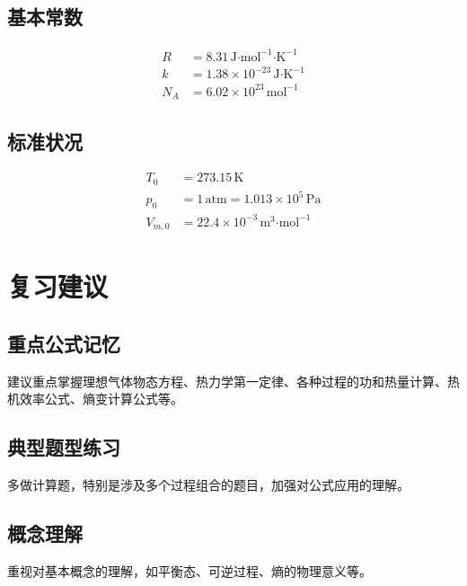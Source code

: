 \documentclass[12pt]{article}
\begin{document}
\subsection{基本常数}
\begin{align*}
    R &= 8.31 \, \text{J·mol}^{-1}\text{·K}^{-1} \\
    k &= 1.38 \times 10^{-23} \, \text{J·K}^{-1} \\
    N_A &= 6.02 \times 10^{23} \, \text{mol}^{-1}
\end{align*}

\subsection{标准状况}
\begin{align*}
    T_0 &= 273.15 \, \text{K} \\
    p_0 &= 1 \, \text{atm} = 1.013 \times 10^5 \, \text{Pa} \\
    V_{m,0} &= 22.4 \times 10^{-3} \, \text{m}^3\text{·mol}^{-1}
\end{align*}

\section*{复习建议}
\subsection{重点公式记忆}
建议重点掌握理想气体物态方程、热力学第一定律、各种过程的功和热量计算、热机效率公式、熵变计算公式等。

\subsection{典型题型练习}
多做计算题，特别是涉及多个过程组合的题目，加强对公式应用的理解。

\subsection{概念理解}
重视对基本概念的理解，如平衡态、可逆过程、熵的物理意义等。
\end{document}
